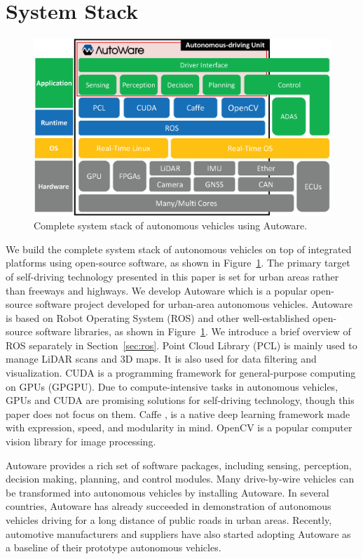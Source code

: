 \section{System Stack}

\begin{figure}[!htbp]
  \centering
  \includegraphics[width=0.6\linewidth]{../figure/system_stack.eps}
  \caption{\label{fig:system_stack}
  Complete system stack of autonomous vehicles using Autoware.}
\end{figure}

We build the complete system stack of autonomous vehicles on top of
integrated platforms using open-source software, as shown in
Figure~\ref{fig:system_stack}.
The primary target of self-driving technology presented in this paper is
 set for urban areas rather than freeways and highways.
We develop Autoware which is a popular
open-source software project developed for urban-area autonomous
vehicles.
Autoware is based on Robot Operating System (ROS) and other
well-established open-source software libraries, as shown in
Figure~\ref{fig:system_stack}.
We introduce a brief overview of ROS separately in Section~\ref{sec:ros}.
Point Cloud Library (PCL) \cite{pcl} is mainly used to manage LiDAR
scans and 3D maps.
It is also used for data filtering and visualization.
CUDA \cite{cuda} is a programming framework for general-purpose
computing on GPUs (GPGPU).
Due to compute-intensive tasks in autonomous vehicles, GPUs and CUDA are
promising solutions for self-driving technology, though this paper does
not focus on them.
Caffe \cite{jia2014caffe}, \cite{caffe} is a native deep learning
framework made with expression, speed, and modularity in mind.
OpenCV \cite{opencv} is a popular computer vision library for image
processing.

Autoware provides a rich set of software packages, including sensing,
perception, decision making, planning, and control modules.
Many drive-by-wire vehicles can be transformed into autonomous vehicles
by installing Autoware.
In several countries, Autoware has already succeeded in demonstration of
autonomous vehicles driving for a long distance of public roads in urban
areas. 
Recently, automotive manufacturers and suppliers have also started
adopting Autoware as a baseline of their prototype autonomous vehicles.


